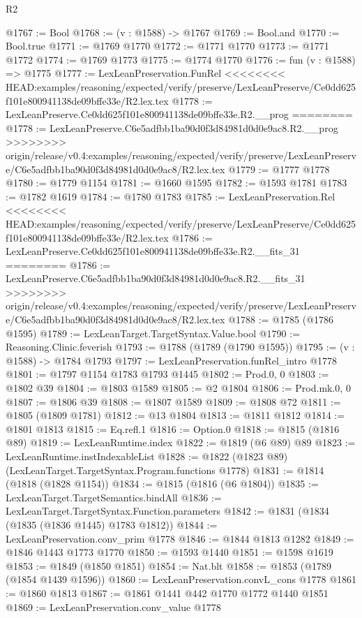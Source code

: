 \begin{lexlean}{R2}
\begin{coremodule}
{{{{{{{{{{{{{{{{{{{{{{{{{{{{{{{{{{{{{{{{{{{{{{{{{{{{{{{{{{{{{{{{{{{{{{{{{{{{{{{{{{{{{{{{{{{{@1767 := Bool
@1768 := (v : @1588) -> @1767
@1769 := Bool.and
@1770 := Bool.true
@1771 := @1769 @1770
@1772 := @1771 @1770
@1773 := @1771 @1772
@1774 := @1769 @1773
@1775 := @1774 @1770
@1776 := fun (v : @1588) => @1775
@1777 := LexLeanPreservation.FunRel
<<<<<<<< HEAD:examples/reasoning/expected/verify/preserve/LexLeanPreserve/Ce0dd625f101e800941138de09bffe33e/R2.lex.tex
@1778 := LexLeanPreserve.Ce0dd625f101e800941138de09bffe33e.R2.__prog
========
@1778 := LexLeanPreserve.C6e5adfbb1ba90d0f3d84981d0d0e9ac8.R2.__prog
>>>>>>>> origin/release/v0.4:examples/reasoning/expected/verify/preserve/LexLeanPreserve/C6e5adfbb1ba90d0f3d84981d0d0e9ac8/R2.lex.tex
@1779 := @1777 @1778
@1780 := @1779 @1154
@1781 := @1660 @1595
@1782 := @1593 @1781
@1783 := @1782 @1619
@1784 := @1780 @1783
@1785 := LexLeanPreservation.Rel
<<<<<<<< HEAD:examples/reasoning/expected/verify/preserve/LexLeanPreserve/Ce0dd625f101e800941138de09bffe33e/R2.lex.tex
@1786 := LexLeanPreserve.Ce0dd625f101e800941138de09bffe33e.R2.__fits_31
========
@1786 := LexLeanPreserve.C6e5adfbb1ba90d0f3d84981d0d0e9ac8.R2.__fits_31
>>>>>>>> origin/release/v0.4:examples/reasoning/expected/verify/preserve/LexLeanPreserve/C6e5adfbb1ba90d0f3d84981d0d0e9ac8/R2.lex.tex
@1788 := @1785 (@1786 @1595)
@1789 := LexLeanTarget.TargetSyntax.Value.bool
@1790 := Reasoning.Clinic.feverish
@1793 := @1788 (@1789 (@1790 @1595))
@1795 := (v : @1588) -> @1784 @1793
@1797 := LexLeanPreservation.funRel_intro @1778
@1801 := @1797 @1154 @1783 @1793 @1445
@1802 := Prod.{0, 0}
@1803 := @1802 @39
@1804 := @1803 @1589
@1805 := @2 @1804
@1806 := Prod.mk.{0, 0}
@1807 := @1806 @39
@1808 := @1807 @1589
@1809 := @1808 @72
@1811 := @1805 (@1809 @1781)
@1812 := @13 @1804
@1813 := @1811 @1812
@1814 := @1801 @1813
@1815 := Eq.refl.{1}
@1816 := Option.{0}
@1818 := @1815 (@1816 @89)
@1819 := LexLeanRuntime.index
@1822 := @1819 (@6 @89) @89
@1823 := LexLeanRuntime.instIndexableList
@1828 := @1822 (@1823 @89) (LexLeanTarget.TargetSyntax.Program.functions @1778)
@1831 := @1814 (@1818 (@1828 @1154))
@1834 := @1815 (@1816 (@6 @1804))
@1835 := LexLeanTarget.TargetSemantics.bindAll
@1836 := LexLeanTarget.TargetSyntax.Function.parameters
@1842 := @1831 (@1834 (@1835 (@1836 @1445) @1783 @1812))
@1844 := LexLeanPreservation.conv_prim @1778
@1846 := @1844 @1813 @1282
@1849 := @1846 @1443 @1773 @1770
@1850 := @1593 @1440
@1851 := @1598 @1619
@1853 := @1849 (@1850 @1851)
@1854 := Nat.blt
@1858 := @1853 (@1789 (@1854 @1439 @1596))
@1860 := LexLeanPreservation.convL_cons @1778
@1861 := @1860 @1813
@1867 := @1861 @1441 @442 @1770 @1772 @1440 @1851
@1869 := LexLeanPreservation.conv_value @1778
}}}}}}}}}}}}}}}}}}}}}}}}}}}}}}}}}}}}}}}}}}}}}}}}}}}}}}}}}}}}}}}}}}}}}}}}}}}}}}}}}}}}}}}}}}}}
\end{coremodule}
\end{lexlean}
